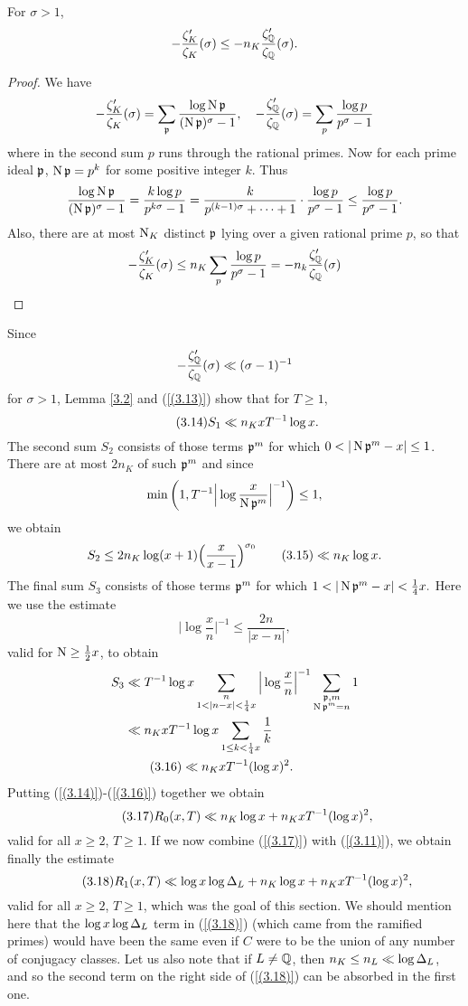 \documentclass[./main]{subfiles}
\begin{document}
\begin{lemma}\label{3.2}
For $\sigma>1$,
\[-\frac{\zeta_K' }{\zeta_K}(\sigma)\le -n_K \frac{\zeta_{\mathbb{Q}} ' }{\zeta_{\mathbb{Q}} }(\sigma). \]
\end{lemma}
\begin{proof}
We have
\[ -\frac{\zeta_K' }{\zeta_K}(\sigma)=\sum_{\mathfrak{p}}\frac{\log \operatorname{N}\mathfrak{p}}{(\operatorname{N}\mathfrak{p})^\sigma-1}, \quad -\frac{\zeta_{\mathbb{Q}} ' }{\zeta_{\mathbb{Q}} }(\sigma)=\sum_p \frac{\log p}{p^\sigma-1}\]
where in the second sum $p$ runs through the rational primes. Now for each prime ideal $\mathfrak{p}$, $\operatorname{N}\mathfrak{p}=p^k$ for some positive integer $k$. Thus
\[ \frac{\log \operatorname{N}\mathfrak{p}}{(\operatorname{N}\mathfrak{p})^\sigma-1}=\frac{k \log p}{p^{k\sigma}-1}=\frac{k}{p^{(k-1)\sigma}+ \dots +1 }\cdot \frac{\log p}{p^\sigma-1}\le \frac{\log p}{p^{\sigma}-1}. \]
Also, there are at most $\operatorname{N}_K$ distinct $\mathfrak{p}$ lying over a given rational prime $p$, so that
\[ -\frac{\zeta_K' }{\zeta_K}(\sigma)\le n_K \sum_p \frac{\log p}{p^\sigma-1}=-n_k\frac{\zeta_{\mathbb{Q}} ' }{\zeta_{\mathbb{Q}} }(\sigma)\]
\end{proof}
Since 
\[-\frac{\zeta_{\mathbb{Q}}'}{\zeta_{\mathbb{Q}} }(\sigma)\ll(\sigma-1)^{-1} \]
for $\sigma>1$, Lemma \ref{3.2}
and (\ref{(3.13)}) show that for $T\ge 1$, 
\[\tag{3.14}\label{(3.14)} S_1 \ll n_KxT^{-1}\log x.\]
The second sum $S_2$ consists of those terms $\mathfrak{p}^m$ for which $0<|\norm\p^m-x| \le 1$. There are at most $2n_K$ of such $\mathfrak{p}^m$ and since
\[ \min\bigg(1, T^{-1}\Big| \log \frac{x}{\operatorname{N}\mathfrak{p}^m}\Big|^{-1}\bigg) \le 1,\]
we obtain
\[
    S_2  \le 2n_K\log(x+1) \Big(\frac{x}{x-1}\Big)^{\sigma_0} 
     \label{3.15}\tag{3.15}\ll  n_K\log x.
\]
The final sum $S_3$ consists of those terms $\mathfrak{p}^m$ for which $1 < |\operatorname{N}\mathfrak{p}^m-x|<\frac{1}{4}x.$ Here we use the estimate
\[ \Big|\log \frac{x}{n}\Big|^{-1}\le \frac{2n}{|x-n|}, \]
valid for $\operatorname{N}\ge \frac{1}{2}x$, to obtain
\begin{align*}
    S_3&\ll T^{-1}\log x \sum_{\substack{n \\ 1< |n-x|< \frac{1}{4}x}}\Big|\log \frac{x}{n}\Big|^{-1}\sum_{\substack{\mathfrak{p}, m \\ \operatorname{N}\mathfrak{p}^m=n}}1 \\
    & \ll n_KxT^{-1}\log x \sum_{1 \le k < \frac{1}{4}x} \frac{1}{k} \\
    & \label{(3.16)} \tag{3.16}\ll n_K xT^{-1}(\log x)^2.
\end{align*}
Putting (\ref{(3.14)})-(\ref{(3.16)}) together we obtain
\[\label{(3.17)} \tag{3.17} R_0(x,T) \ll n_K\log x + n_KxT^{-1}(\log x)^2,\]
valid for all $x \ge 2$, $T\ge 1$. If we now combine (\ref{(3.17)}) with (\ref{(3.11)}), we obtain finally the estimate
\[\label{(3.18)} \tag{3.18} R_1(x,T) \ll\log x \log \Delta_L+n_K\log x+ n_KxT^{-1}(\log x)^2,  \]
valid for all $x \ge 2$, $T\ge 1$, which was the goal of this section. We should mention here that the $\log x \log \Delta_L$ term in (\ref{(3.18)}) (which came from the ramified primes) would have been the same even if $C$ were to be the union of any number of conjugacy classes. Let us also note that if $L \neq \mathbb{Q} $, then $n_K \le n_L \ll \log \Delta_L$, and so the second term on the right side of (\ref{(3.18)}) can be absorbed in the first one.
\end{document}
